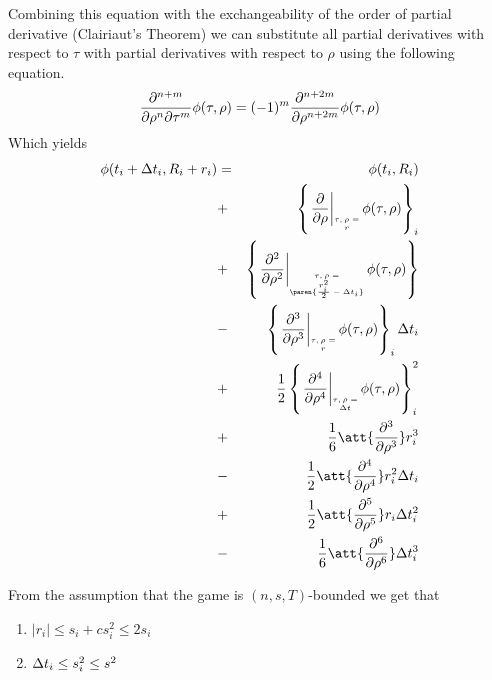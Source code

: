 \documentclass{article}[12pt]
\begin{document}
{Combining this equation with the exchangeability of the order of
partial derivative (Clairiaut's Theorem) we can substitute all
partial derivatives with respect to $\tau$ with partial derivatives
with respect to $\rho$ using the following equation.
\[
  \frac{\partial^{n+m}}{\partial \rho^n \partial \tau^m} \phi(\tau,\rho)=
  (-1)^m \frac{\partial^{n+2m}}{\partial \rho^{n+2m}} \phi(\tau,\rho)
\]
Which yields
\begin{eqnarray}
      \pot(t_i+\deltat_i,\R_i+r_i) & =&  
    \pot(t_i,\R_i)\\
    &+& \at{\frac{\partial}{\partial \rho}{}} r_i \label{term:coll1}\\
    &+& \at{\frac{\partial^2}{\partial \rho^2}} \paren{\frac{r_i^2}{2}-\deltat_i} \label{term:coll2}\\
    &-& \at{\frac{\partial^3}{\partial \rho^3}} r_i \deltat_i \label{term:coll3}\\
    &+& \frac{1}{2} \at{\frac{\partial^4}{\partial \rho^4}} \deltat_i^2 \label{term:coll4}\\
    &+& \frac{1}{6} \att{\frac{\partial^3}{\partial \rho^3}} r_i^3 \label{term:coll5}\\
    &-& \frac{1}{2} \att{\frac{\partial^4}{\partial \rho^4}} r_i^2\deltat_i \label{term:coll6}\\
    &+& \frac{1}{2} \att{\frac{\partial^5}{\partial \rho^5}} r_i\deltat_i^2 \label{term:coll7}\\
    &-& \frac{1}{6} \att{\frac{\partial^6}{\partial \rho^6}} \deltat_i^3 \label{term:coll8}
\end{eqnarray}

  From the assumption that the game is $(n,s,T)$-bounded we get that 
  \begin{enumerate}
  \item $|r_i| \leq s_i +c s_i^2 \leq 2 s_i$
  \item $\Delta t_i \leq s_i^2 \leq s^2$
  \end{enumerate}

}
\end{document}
